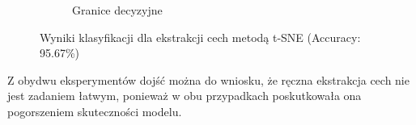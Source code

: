 \documentclass[10pt]{article}
\begin{document}
\begin{figure}[H]
\begin{subfigure}[t]{.5\textwidth}
        \caption{Granice decyzyjne}\label{fig:tsne-db}
    \end{subfigure}
    \caption{Wyniki klasyfikacji dla ekstrakcji cech metodą t-SNE (Accuracy: 95.67\%)}
\end{figure}

Z obydwu eksperymentów dojść można do wniosku, 
że ręczna ekstrakcja cech nie jest zadaniem łatwym, 
ponieważ w obu przypadkach poskutkowała ona pogorszeniem skuteczności modelu.
\end{document}
